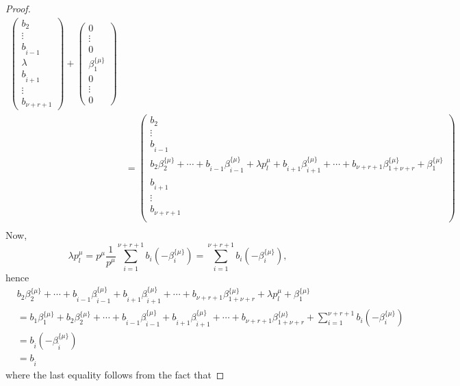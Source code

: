\begin{proof}
\begin{align*}
\begin{pmatrix}
b_2 \\ \vdots \\ b_{\hat{i} -1} \\ \lambda \\ b_{\hat{i} +1} \\ \vdots \\ b_{\nu + r + 1} 
\end{pmatrix}
+ \begin{pmatrix}
0 \\ \vdots \\ 0 \\ \beta_1^{\{\mu\}} \\ 0 \\ \vdots \\ 0 
\end{pmatrix}\\
& = \begin{pmatrix}
b_2 \\ \vdots \\ b_{\hat{i} -1} \\ 
 b_2\beta_2^{\{\mu\}} + \cdots + b_{\hat{i} - 1}\beta_{\hat{i} - 1}^{\{\mu\}} + \lambda p_l^{\mu} + b_{\hat{i} + 1}\beta_{\hat{i} + 1}^{\{\mu\}} + \cdots + b_{\nu+r+ 1}\beta_{1+\nu+r}^{\{\mu\}} + \beta_1^{\{\mu\}} \\
b_{\hat{i} +1} \\ \vdots \\ b_{\nu+r+1} \\
\end{pmatrix}\\
\end{align*}
Now, 
\[ \lambda p_l^{\mu} = p^{\mu}\frac{1}{p^{\mu}}\sum_{i = 1}^{\nu + r + 1}b_i(-\beta_i^{\{\mu\}}) = \sum_{i = 1}^{\nu + r + 1}b_i(-\beta_i^{\{\mu\}}),\]
hence
\begin{align*}
& b_2\beta_2^{\{\mu\}} + \cdots + b_{\hat{i} - 1}\beta_{\hat{i} - 1}^{\{\mu\}} + b_{\hat{i} + 1}\beta_{\hat{i} + 1}^{\{\mu\}} + \cdots + b_{\nu+r+ 1}\beta_{1+\nu+r}^{\{\mu\}} + \lambda p_l^{\mu} + \beta_1^{\{\mu\}}\\
& = b_1 \beta_1^{\{\mu\}} + b_2\beta_2^{\{\mu\}} + \cdots + b_{\hat{i} - 1}\beta_{\hat{i} - 1}^{\{\mu\}} + b_{\hat{i} + 1}\beta_{\hat{i} + 1}^{\{\mu\}} + \cdots + b_{\nu+r+ 1}\beta_{1+\nu+r}^{\{\mu\}} + \sum_{i = 1}^{\nu + r + 1}b_i(-\beta_i^{\{\mu\}}) \\
& = b_{\hat{i}}(-\beta_{\hat{i}}^{\{\mu\}})\\
& = b_{\hat{i}}
\end{align*}
where the last equality follows from the fact that 

\end{proof}
